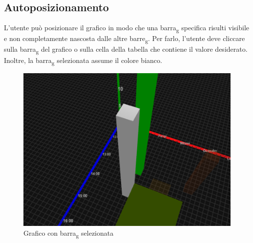 \subsection{Autoposizionamento}
L'utente può posizionare il grafico in modo che una barra\textsubscript{g} specifica risulti
visibile e non completamente nascosta dalle altre barre\textsubscript{g}. 
Per farlo, l'utente deve cliccare sulla barra\textsubscript{g} del grafico o sulla
cella della tabella che contiene il valore desiderato. Inoltre, la barra\textsubscript{g}
selezionata assume il colore bianco.
\begin{figure}[ht!]
    \centering
    \includegraphics[scale=0.6]{template/images/selected.png}
    \caption{Grafico con barra\textsubscript{g} selezionata}
\end{figure}